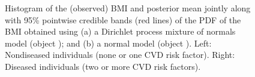 \begin{figure}[ht!]
\begin{center}
\end{center}
\caption{Histogram of the (observed) BMI and posterior mean jointly along with 95\% pointwise credible bands (red lines) of the PDF of the BMI obtained using (a) a Dirichlet process mixture of normals model (object ); and (b) a normal model (object ). Left: Nondiseased individuals (none or one CVD risk factor). Right: Diseased individuals (two or more CVD risk factors).}
\end{figure}

